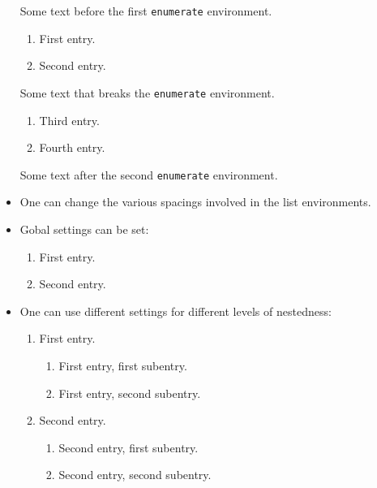 \documentclass[a4paper, 10pt, abstract=on, headings=standardclasses]{scrartcl}
\begin{document}
\begin{itemize}
    \begin{LTXexample}[pos = r]
      Some text before the first \texttt{enumerate} environment.
      \begin{enumerate}
        \item
          First entry.
        \item
          Second entry.
      \end{enumerate}
      Some text that breaks the \texttt{enumerate} environment.
      \begin{enumerate}[resume]
        \item
          Third entry.
        \item
          Fourth entry.
      \end{enumerate}
      Some text after the second \texttt{enumerate} environment.
    \end{LTXexample}
  \item
    One can change the various spacings involved in the list environments.
  \item
    Gobal settings can be set:
    \begin{LTXexample}[pos = r]
      \begin{enumerate}
        \item
          First entry.
        \item
          Second entry.
      \end{enumerate}
    \end{LTXexample}
  \item
    One can use different settings for different levels of nestedness:
    \begin{LTXexample}[pos = b]
      \begin{enumerate}[label = \Roman*]
        \item
          First entry.
          \begin{enumerate}[label = \alph*]
            \item
              First entry, first subentry.
            \item
              First entry, second subentry.
          \end{enumerate}
        \item
          Second entry.
          \begin{enumerate}[label = \arabic*]
            \item
              Second entry, first subentry.
            \item
              Second entry, second subentry.

\end{enumerate}
\end{enumerate}
\end{LTXexample}
\end{itemize}
\end{document}
